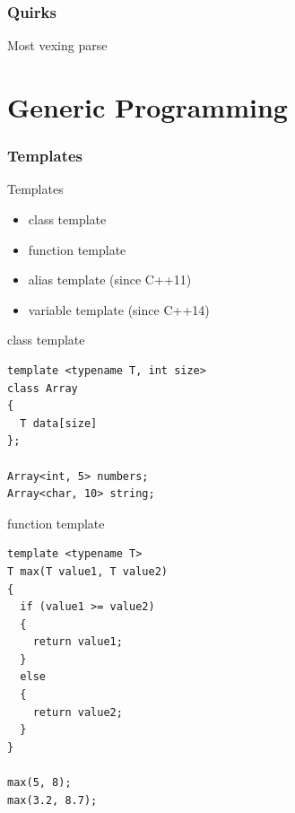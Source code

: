 \documentclass{beamer}
\begin{document}
\section{Quirks}

\begin{frame}{Most vexing parse}
\end{frame}


\part{Generic Programming}

\section{Templates}
\begin{frame}{Templates}
\begin{itemize}
  \item class template
  \item function template
  \item alias template (since C++11)
  \item variable template (since C++14)
\end{itemize}
\end{frame}

\begin{frame}[fragile]{class template}
\begin{lstlisting}
template <typename T, int size>
class Array
{
  T data[size]
};

Array<int, 5> numbers;
Array<char, 10> string;
\end{lstlisting}
\end{frame}

\begin{frame}[fragile]{function template}
\begin{lstlisting}
template <typename T>
T max(T value1, T value2)
{
  if (value1 >= value2)
  {
    return value1;
  }
  else
  {
    return value2;
  }
}

max(5, 8);
max(3.2, 8.7);
\end{lstlisting}
\end{frame}
\end{document}
